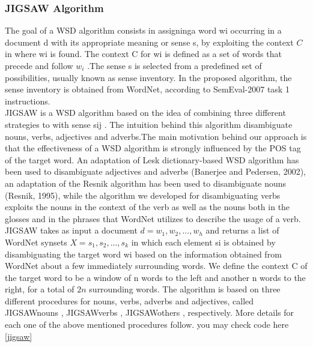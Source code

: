 \subsubsection{JIGSAW Algorithm\citep{disambiguation}}
\label{jigsawSec}
The goal of a WSD algorithm consists in assigninga word wi occurring in a document d with its appropriate meaning or sense s, by exploiting the context $C$ in where wi is found. The context C for wi is defined as a set of words that precede and follow $w_i$ .The sense s is selected from a predefined set of possibilities, usually known as sense inventory. In the proposed algorithm, the sense inventory is obtained from WordNet, according to SemEval-2007 task 1 instructions. \\
JIGSAW is a WSD algorithm based on the idea of combining three different strategies to with sense sij . The intuition behind this algorithm disambiguate nouns, verbs, adjectives and adverbs.The main motivation behind our approach is that the effectiveness of a WSD algorithm is strongly influenced by the POS tag of the target word. An adaptation of Lesk dictionary-based WSD algorithm has been used to disambiguate adjectives and adverbs (Banerjee and Pedersen, 2002), an adaptation of the Resnik algorithm has been used to disambiguate nouns (Resnik, 1995), while the algorithm we developed for disambiguating verbs exploits the nouns in the context of the verb as well as the nouns both in the glosses and in the phrases that WordNet utilizes to describe the usage of a verb. \\
JIGSAW takes as input a document $d = {w_1 , w_2 , . . . , w_h }$ and returns a list of WordNet synsets $X = {s_1 , s_2 , . . . ,s_k }$ in which each element si is obtained by disambiguating the target word wi based on the information obtained from WordNet about a few immediately surrounding words. We define the context C of the target word to be a window of n words to the left and another n words to the right, for a total of $2n$ surrounding words. The algorithm is based on three different procedures for nouns, verbs, adverbs and adjectives, called JIGSAWnouns , JIGSAWverbs , JIGSAWothers , respectively. More details for each one of the above mentioned procedures follow.
you may check code here \ref{jigsaw}     

